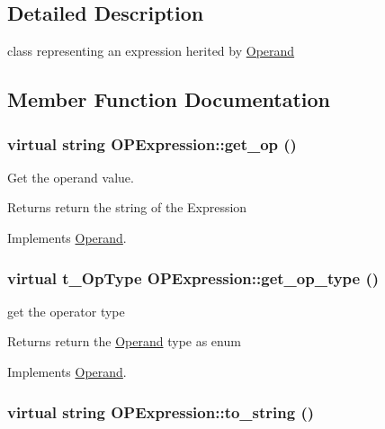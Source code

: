 \subsection{Detailed Description}
class representing an expression herited by \hyperlink{classOperand}{Operand} 

\subsection{Member Function Documentation}
\hypertarget{classOPExpression_acf86deca614626b803bc3c29facbefef}{
\subsubsection[{get\_\-op}]{\setlength{\rightskip}{0pt plus 5cm}virtual string OPExpression::get\_\-op ()}}
\label{classOPExpression_acf86deca614626b803bc3c29facbefef}


Get the operand value. \begin{DoxyReturn}{Returns}
return the string of the Expression 
\end{DoxyReturn}


Implements \hyperlink{classOperand_a2bf3ad8b34d39cb35ff743ffcc0f4675}{Operand}.\hypertarget{classOPExpression_a06f8902130516437d5d93c43a5efcbd2}{
\subsubsection[{get\_\-op\_\-type}]{\setlength{\rightskip}{0pt plus 5cm}virtual t\_\-OpType OPExpression::get\_\-op\_\-type ()}}
\label{classOPExpression_a06f8902130516437d5d93c43a5efcbd2}


get the operator type \begin{DoxyReturn}{Returns}
return the \hyperlink{classOperand}{Operand} type as enum 
\end{DoxyReturn}


Implements \hyperlink{classOperand_afd469e305a467e2574f34ac9bd6c62b0}{Operand}.\hypertarget{classOPExpression_a0a6ee03eb083791028eeae021f4ff47b}{
\subsubsection[{to\_\-string}]{\setlength{\rightskip}{0pt plus 5cm}virtual string OPExpression::to\_\-string ()}}
\label{classOPExpression_a0a6ee03eb083791028eeae021f4ff47b}


